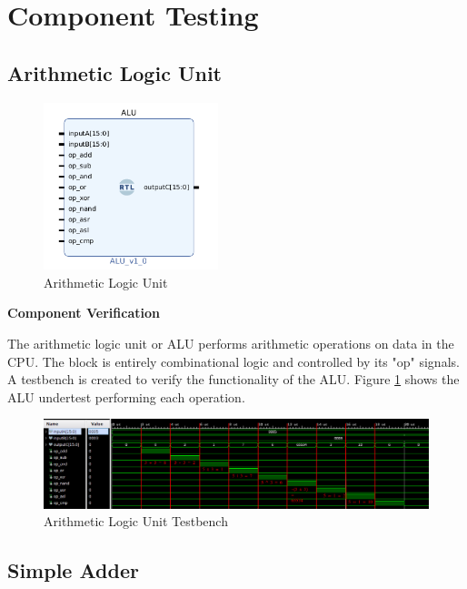 \documentclass{article}
\newcommand{\stitle}{Component Verification}
\begin{document}
\section{Component Testing}
\label{compd}
\begin{par}
	
	\subsection{Arithmetic Logic Unit}
	
	\begin{figure}[H]
		\centering
		\includegraphics[width=2in]{img/alu.png}
		\caption{Arithmetic Logic Unit}
	\end{figure}

	\textbf{\stitle}
	\begin{par}
		The arithmetic logic unit or ALU performs arithmetic operations on data in the CPU. The block is entirely combinational logic and controlled by its "op" signals. A testbench is created to verify the functionality of the ALU. Figure \ref{fig:alutbfig} shows the ALU undertest performing each operation. 
	\end{par}

	\begin{figure}[H]
		\centering
		\includegraphics[width=7in]{img/alu_tb.png}
		\caption{Arithmetic Logic Unit Testbench}
		\label{fig:alutbfig}
	\end{figure}

	\newpage

	\subsection{Simple Adder}
	

\end{par}
\end{document}
